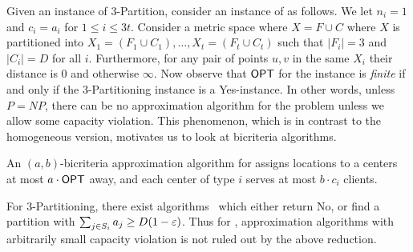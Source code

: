 Given an instance of $3$-Partition, consider an instance of \mckc as follows. We let $n_i = 1$ and $c_i = a_i$ for $1\leq i\leq 3t$. %
Consider a metric space where $X = F\cup C$ where $X$ is partitioned into $X_1 = (F_1\cup C_1),\ldots,X_t = (F_t\cup C_t)$ such that $|F_i| = 3$ and $|C_i| = D$ for all $i$.
Furthermore, for any pair of points $u,v$ in the same $X_i$ their distance is $0$ and otherwise $\infty$. 
Now observe that $\mathsf{OPT}$ for the \mckc instance is {\em finite} if and only if the $3$-Partitioning instance is a Yes-instance. In other words, unless $P=NP$, there can be no approximation algorithm for the problem
unless we allow some capacity violation. This phenomenon, which is in contrast to the homogeneous version, motivates us to look at bicriteria algorithms.

 \begin{definition}
 	An $(a,b)$-bicriteria approximation algorithm for \mckc assigns locations to a centers at most $a\cdot\mathsf{OPT}$ away, and each center of type $i$ serves at most $b\cdot c_i$ clients. %
 \end{definition}
 For $3$-Partitioning, there exist algorithms~\cite{bibid} which either return No, or find a partition with $\sum_{j\in S_i} a_j \geq D(1-\varepsilon)$. Thus for \mckc, approximation algorithms with  arbitrarily small capacity violation is not ruled out by the above reduction.
 
